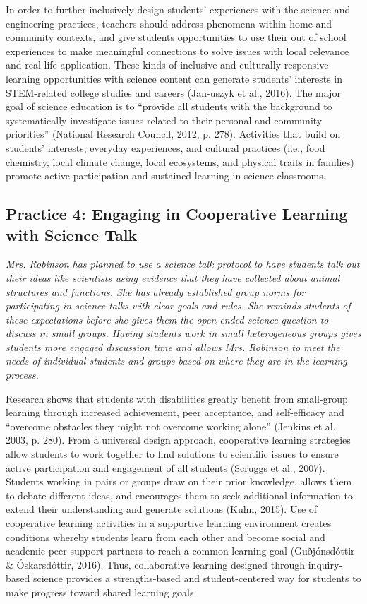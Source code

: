 \documentclass[11.5pt]{sig-alternate}
\begin{document}
\begin{large}
In order to further inclusively design students’ experiences with the science and engineering practices, teachers should address phenomena within home and community contexts, and give students opportunities to use their out of school experiences to make meaningful connections to solve issues with local relevance and real-life application. These kinds of inclusive and culturally responsive learning opportunities with science content can generate students’ interests in STEM-related college studies and careers (Jan-uszyk et al., 2016). The major goal of science education is to “provide all students with the background to systematically investigate issues related to their personal and community priorities” (National Research Council, 2012, p. 278). Activities that build on students’ interests, everyday experiences, and cultural practices (i.e., food chemistry, local climate change, local ecosystems, and physical traits in families) promote active participation and sustained learning in science classrooms.

\subsection*{Practice 4: Engaging in Cooperative Learning with Science Talk}

\textit{Mrs. Robinson has planned to use a science talk protocol to have students talk out their ideas like scientists using evidence that they have collected about animal structures and functions. She has already established group norms for participating in science talks with clear goals and rules. She reminds students of these expectations before she gives them the open-ended science question to discuss in small groups. Having students work in small heterogeneous groups gives students more engaged discussion time and allows Mrs. Robinson to meet the needs of individual students and groups based on where they are in the learning process.}

Research shows that students with disabilities greatly benefit from small-group learning through increased achievement, peer acceptance, and self-efficacy and “overcome obstacles they might not overcome working alone” (Jenkins et al. 2003, p. 280). From a universal design approach, cooperative learning strategies allow students to work together to find solutions to scientific issues to ensure active participation and engagement of all students (Scruggs et al., 2007). Students working in pairs or groups draw on their prior knowledge, allows them to debate different ideas, and encourages them to seek additional information to extend their understanding and generate solutions (Kuhn, 2015). Use of cooperative learning activities in a supportive learning environment creates conditions whereby students learn from each other and become social and academic peer support partners to reach a common learning goal (Guðjónsdóttir \& Óskarsdóttir, 2016). Thus, collaborative learning designed through inquiry-based science provides a strengths-based and student-centered way for students to make progress toward shared learning goals.


\end{large}
\end{document}
